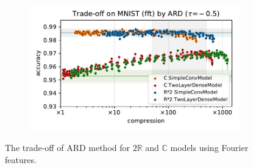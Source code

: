 \documentclass[a4paper,10pt,onecolumn]{article}
\newcommand{\real}{\mathbb{R}}
\newcommand{\cplx}{\mathbb{C}}
\begin{document}
\begin{figure}[b]
\begin{subfigure}[b]{0.5\columnwidth}
  \end{subfigure}%
  \begin{subfigure}[b]{0.5\columnwidth}
    \centering
    \includegraphics[width=\linewidth]{figure__mnist-like__trade-off/appendix__cmp__ARD__mnist__fft__-0.5.pdf}
  \end{subfigure}
  \caption{%
    The trade-off of ARD method for $2\real$ and $\cplx$ models using Fourier features.
  }
  \label{fig:appendix__cmp__mnist-like__trade-off__ARD__fft}
\end{figure}
\end{document}
